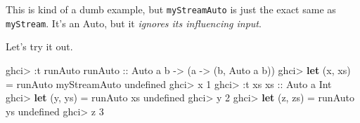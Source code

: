 \documentclass[]{article}
\newenvironment{Shaded}{}{}
\newcommand{\CommentTok}[1]{\textcolor[rgb]{0.38,0.63,0.69}{\textit{#1}}}
\newcommand{\DataTypeTok}[1]{\textcolor[rgb]{0.56,0.13,0.00}{#1}}
\newcommand{\DecValTok}[1]{\textcolor[rgb]{0.25,0.63,0.44}{#1}}
\newcommand{\FunctionTok}[1]{\textcolor[rgb]{0.02,0.16,0.49}{#1}}
\newcommand{\KeywordTok}[1]{\textcolor[rgb]{0.00,0.44,0.13}{\textbf{#1}}}
\newcommand{\NormalTok}[1]{#1}
\newcommand{\OperatorTok}[1]{\textcolor[rgb]{0.40,0.40,0.40}{#1}}
\newcommand{\OtherTok}[1]{\textcolor[rgb]{0.00,0.44,0.13}{#1}}
\begin{document}
\begin{Shaded}
\end{Shaded}

This is kind of a dumb example, but \texttt{myStreamAuto} is just the exact same
as \texttt{myStream}. It's an Auto, but it \emph{ignores its influencing input}.

Let's try it out.

\begin{Shaded}
\begin{Highlighting}[]
\NormalTok{ghci}\OperatorTok{\textgreater{}} \OperatorTok{:}\NormalTok{t runAuto}
\OtherTok{runAuto ::} \DataTypeTok{Auto}\NormalTok{ a b }\OtherTok{{-}\textgreater{}}\NormalTok{ (a }\OtherTok{{-}\textgreater{}}\NormalTok{ (b, }\DataTypeTok{Auto}\NormalTok{ a b))}
\NormalTok{ghci}\OperatorTok{\textgreater{}} \KeywordTok{let}\NormalTok{ (x, xs) }\OtherTok{=}\NormalTok{ runAuto myStreamAuto }\FunctionTok{undefined}
\NormalTok{ghci}\OperatorTok{\textgreater{}}\NormalTok{ x}
\DecValTok{1}
\NormalTok{ghci}\OperatorTok{\textgreater{}} \OperatorTok{:}\NormalTok{t xs}
\OtherTok{xs ::} \DataTypeTok{Auto}\NormalTok{ a }\DataTypeTok{Int}
\NormalTok{ghci}\OperatorTok{\textgreater{}} \KeywordTok{let}\NormalTok{ (y, ys) }\OtherTok{=}\NormalTok{ runAuto xs }\FunctionTok{undefined}
\NormalTok{ghci}\OperatorTok{\textgreater{}}\NormalTok{ y}
\DecValTok{2}
\NormalTok{ghci}\OperatorTok{\textgreater{}} \KeywordTok{let}\NormalTok{ (z, zs) }\OtherTok{=}\NormalTok{ runAuto ys }\FunctionTok{undefined}
\NormalTok{ghci}\OperatorTok{\textgreater{}}\NormalTok{ z}
\DecValTok{3}
\end{Highlighting}
\end{Shaded}
\end{document}
